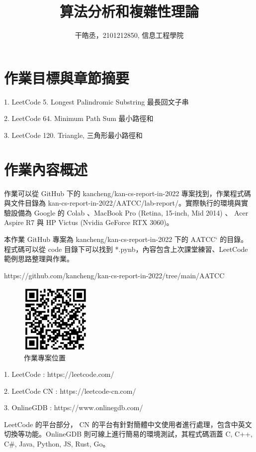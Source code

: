 \documentclass[10pt,UTF8]{ctexart}
\title{算法分析和複雜性理論}
\author{干皓丞，2101212850, 信息工程學院}
\begin{document}
\maketitle


\section{作業目標與章節摘要}

1. LeetCode 5. Longest Palindromic Substring 最長回文子串

2. LeetCode 64. Minimum Path Sum 最小路徑和

3. LeetCode 120. Triangle, 三角形最小路徑和


\section{作業內容概述}

作業可以從 GitHub 下的 kancheng/kan-cs-report-in-2022 專案找到，作業程式碼與文件目錄為 kan-cs-report-in-2022/AATCC/lab-report/。實際執行的環境與實驗設備為 Google 的 Colab 、MacBook Pro (Retina, 15-inch, Mid 2014) 、 Acer Aspire R7 與 HP Victus (Nvidia GeForce RTX 3060)。

本作業 GitHub 專案為 kancheng/kan-cs-report-in-2022 下的 AATCC` 的目錄。程式碼可以從 code 目錄下可以找到 *.pynb，內容包含上次課堂練習、LeetCode 範例思路整理與作業。

https://github.com/kancheng/kan-cs-report-in-2022/tree/main/AATCC

\begin{figure}[H]
\centering 
\includegraphics[width=0.30\textwidth]{aatccqr.png} 
\caption{作業專案位置}
\label{Test}
\end{figure}


1. LeetCode : https://leetcode.com/

2. LeetCode CN : https://leetcode-cn.com/

3. OnlineGDB : https://www.onlinegdb.com/ 

LeetCode 的平台部分， CN 的平台有針對簡體中文使用者進行處理，包含中英文切換等功能。OnlineGDB 則可線上進行簡易的環境測試，其程式碼涵蓋 C, C++, C\#, Java, Python, JS, Rust, Go。
\end{document}
